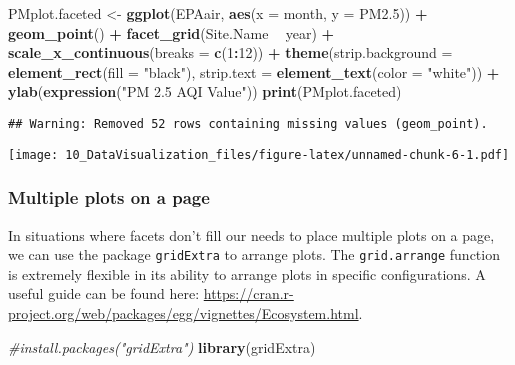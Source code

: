 \documentclass[]{article}
\newenvironment{Shaded}{\begin{snugshade}}{\end{snugshade}}
\newcommand{\KeywordTok}[1]{\textcolor[rgb]{0.13,0.29,0.53}{\textbf{#1}}}
\newcommand{\DataTypeTok}[1]{\textcolor[rgb]{0.13,0.29,0.53}{#1}}
\newcommand{\DecValTok}[1]{\textcolor[rgb]{0.00,0.00,0.81}{#1}}
\newcommand{\StringTok}[1]{\textcolor[rgb]{0.31,0.60,0.02}{#1}}
\newcommand{\CommentTok}[1]{\textcolor[rgb]{0.56,0.35,0.01}{\textit{#1}}}
\newcommand{\OperatorTok}[1]{\textcolor[rgb]{0.81,0.36,0.00}{\textbf{#1}}}
\newcommand{\NormalTok}[1]{#1}
\begin{document}
\begin{Shaded}
\begin{Highlighting}[]
\NormalTok{PMplot.faceted <-}
\StringTok{  }\KeywordTok{ggplot}\NormalTok{(EPAair, }\KeywordTok{aes}\NormalTok{(}\DataTypeTok{x =}\NormalTok{ month, }\DataTypeTok{y =}\NormalTok{ PM2.}\DecValTok{5}\NormalTok{)) }\OperatorTok{+}
\StringTok{  }\KeywordTok{geom_point}\NormalTok{() }\OperatorTok{+}
\StringTok{  }\KeywordTok{facet_grid}\NormalTok{(Site.Name }\OperatorTok{~}\StringTok{ }\NormalTok{year) }\OperatorTok{+}\StringTok{ }
\StringTok{  }\KeywordTok{scale_x_continuous}\NormalTok{(}\DataTypeTok{breaks =} \KeywordTok{c}\NormalTok{(}\DecValTok{1}\OperatorTok{:}\DecValTok{12}\NormalTok{)) }\OperatorTok{+}
\StringTok{  }\KeywordTok{theme}\NormalTok{(}\DataTypeTok{strip.background =} \KeywordTok{element_rect}\NormalTok{(}\DataTypeTok{fill =} \StringTok{"black"}\NormalTok{), }\DataTypeTok{strip.text =} \KeywordTok{element_text}\NormalTok{(}\DataTypeTok{color =} \StringTok{"white"}\NormalTok{)) }\OperatorTok{+}
\StringTok{  }\KeywordTok{ylab}\NormalTok{(}\KeywordTok{expression}\NormalTok{(}\StringTok{"PM 2.5 AQI Value"}\NormalTok{)) }
\KeywordTok{print}\NormalTok{(PMplot.faceted)}
\end{Highlighting}
\end{Shaded}

\begin{verbatim}
## Warning: Removed 52 rows containing missing values (geom_point).
\end{verbatim}

\texttt{[image: 10\_DataVisualization\_files/figure-latex/unnamed-chunk-6-1.pdf]}

\subsubsection{Multiple plots on a page}\label{multiple-plots-on-a-page}

In situations where facets don't fill our needs to place multiple plots
on a page, we can use the package \texttt{gridExtra} to arrange plots.
The \texttt{grid.arrange} function is extremely flexible in its ability
to arrange plots in specific configurations. A useful guide can be found
here:
\url{https://cran.r-project.org/web/packages/egg/vignettes/Ecosystem.html}.

\begin{Shaded}
\begin{Highlighting}[]
\CommentTok{#install.packages("gridExtra")}
\KeywordTok{library}\NormalTok{(gridExtra)}
\end{Highlighting}
\end{Shaded}
\end{document}
